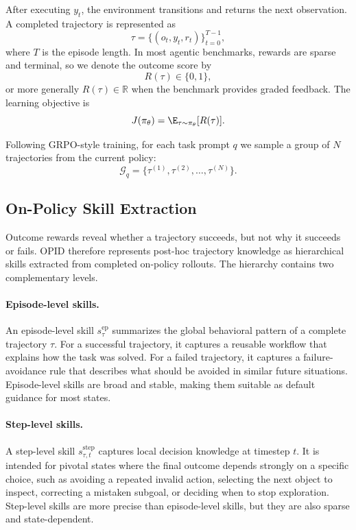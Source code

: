 After executing $y_t$, the environment transitions and returns the next observation. A completed trajectory is represented as
\begin{equation*}
    \tau = \{(o_t, y_t, r_t)\}_{t=0}^{T-1},
\end{equation*}
where $T$ is the episode length. In most agentic benchmarks, rewards are sparse and terminal, so we denote the outcome score by
\begin{equation*}
    R(\tau) \in \{0,1\},
\end{equation*}
or more generally $R(\tau)\in\mathbb{R}$ when the benchmark provides graded feedback. The learning objective is
\begin{equation*}
    J(\pi_\theta) = \E_{\tau\sim\pi_\theta}[R(\tau)].
\end{equation*}

Following GRPO-style training, for each task prompt $q$ we sample a group of $N$ trajectories from the current policy:
\begin{equation*}
    \mathcal{G}_q = \{\tau^{(1)}, \tau^{(2)}, \ldots, \tau^{(N)}\}.
\end{equation*}


\subsection{On-Policy Skill Extraction}

Outcome rewards reveal whether a trajectory succeeds, but not why it succeeds or fails. OPID{} therefore represents post-hoc trajectory knowledge as hierarchical skills extracted from completed on-policy rollouts. The hierarchy contains two complementary levels.

\paragraph{Episode-level skills.}
An episode-level skill $s^{\mathrm{ep}}_{\tau}$ summarizes the global behavioral pattern of a complete trajectory $\tau$. For a successful trajectory, it captures a reusable workflow that explains how the task was solved. For a failed trajectory, it captures a failure-avoidance rule that describes what should be avoided in similar future situations. Episode-level skills are broad and stable, making them suitable as default guidance for most states.

\paragraph{Step-level skills.}
A step-level skill $s^{\mathrm{step}}_{\tau,t}$ captures local decision knowledge at timestep $t$. It is intended for pivotal states where the final outcome depends strongly on a specific choice, such as avoiding a repeated invalid action, selecting the next object to inspect, correcting a mistaken subgoal, or deciding when to stop exploration. Step-level skills are more precise than episode-level skills, but they are also sparse and state-dependent.


